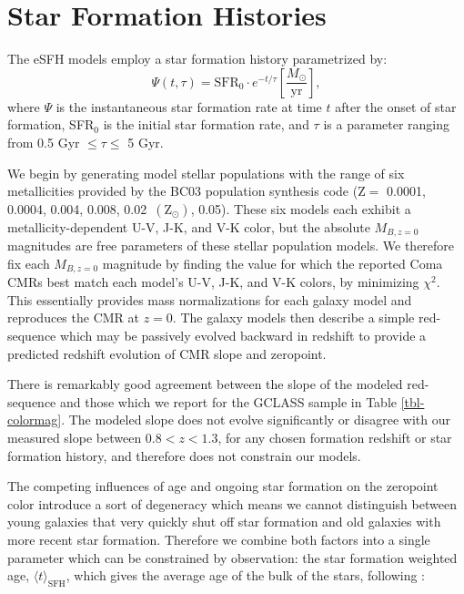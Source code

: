 
\appendix



\chapter{Star Formation Histories}\label{appendix}

The eSFH models employ a star formation history parametrized by:
\begin{equation}\label{eq-esfh}
\Psi(t,\tau) = \mathrm{SFR}_0\cdot e^{-t/\tau} \left[ \frac{M_{\odot}}{\mathrm{yr}} \right],
\end{equation}
where $\Psi$ is the instantaneous star formation rate at time $t$ after the onset of star formation, SFR$_0$ is the initial star formation rate, and $\tau$ is a parameter ranging from 0.5 Gyr $\leq \tau \leq$ 5 Gyr.

We begin by generating model stellar populations with the range of six metallicities provided by the BC03 population synthesis code ($\mathrm{Z} =$ 0.0001, 0.0004, 0.004, 0.008, 0.02\, $(\mathrm{Z}_\odot)$, 0.05). These six models each exhibit a metallicity-dependent U-V, J-K, and V-K color, but the absolute $M_{B,z=0}$ magnitudes are free parameters of these stellar population models.
We therefore fix each $M_{B,z=0}$ magnitude by finding the value for which the reported Coma CMRs \citep{Bower:1992mb} best match each model's U-V, J-K, and V-K colors, by minimizing $\chi^2$.
This essentially provides mass normalizations for each galaxy model and reproduces the CMR at $z=0$. The galaxy models then describe a simple red-sequence which may be passively evolved backward in redshift to provide a predicted redshift evolution of CMR slope and zeropoint.

There is remarkably good agreement between the slope of the modeled red-sequence and those which we report for the GCLASS sample in Table \ref{tbl-colormag}. The modeled slope does not evolve significantly or disagree with our measured slope between $0.8 < z < 1.3$, for any chosen formation redshift or star formation history, and therefore does not constrain our models.

The competing influences of age and ongoing star formation on the zeropoint color introduce a sort of degeneracy which means we cannot distinguish between young galaxies that very quickly shut off star formation and old galaxies with more recent star formation. Therefore we combine both factors into a single parameter which can be constrained by observation: the star formation weighted age, $\langle t \rangle_\mathrm{SFH}$, which gives the average age of the bulk of the stars, following \citet{Rettura:2011aa}:

